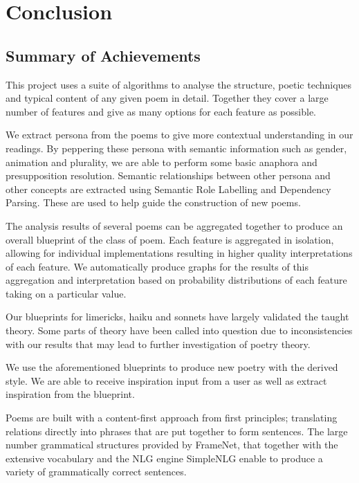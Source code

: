 \def\baselinestretch{1}
\chapter{Conclusion}
\ifpdf
    \graphicspath{{Conclusions/ConclusionsFigs/PNG/}{Conclusions/ConclusionsFigs/PDF/}{Conclusions/ConclusionsFigs/}}
\else
    \graphicspath{{Conclusions/ConclusionsFigs/EPS/}{Conclusions/ConclusionsFigs/}}
\fi

\def\baselinestretch{1.66}


\section{Summary of Achievements}

This project uses a suite of algorithms to analyse the structure, poetic techniques and typical content of any given poem in detail. Together they cover a large number of features and give as many options for each feature as possible.

We extract persona from the poems to give more contextual understanding in our readings. By peppering these persona with semantic information such as gender, animation and plurality, we are able to perform some basic anaphora and presupposition resolution. Semantic relationships between other persona and other concepts are extracted using Semantic Role Labelling and Dependency Parsing. These are used to help guide the construction of new poems.

The analysis results of several poems can be aggregated together to produce an overall blueprint of the class of poem. Each feature is aggregated in isolation, allowing for individual implementations resulting in higher quality interpretations of each feature. We automatically produce graphs for the results of this aggregation and interpretation based on probability distributions of each feature taking on a particular value.

Our blueprints for limericks, haiku and sonnets have largely validated the taught theory. Some parts of theory have been called into question due to inconsistencies with our results that may lead to further investigation of poetry theory.

We use the aforementioned blueprints to produce new poetry with the derived style. We are able to receive inspiration input from a user as well as extract inspiration from the blueprint.

Poems are built with a content-first approach from first principles; translating relations directly into phrases that are put together to form sentences. The large number grammatical structures provided by FrameNet, that together with the extensive vocabulary and the NLG engine SimpleNLG enable to produce a variety of grammatically correct sentences.


